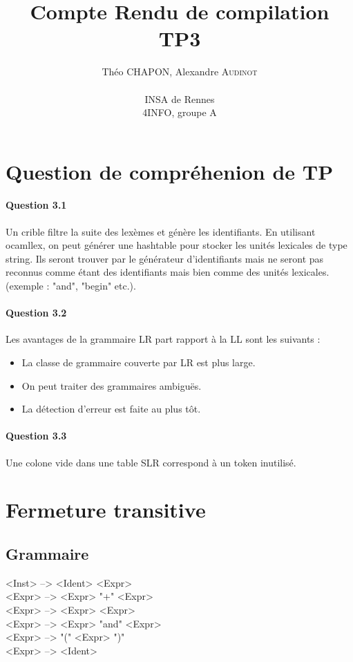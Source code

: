\documentclass[a4paper,12pt]{article}
\author{
  Théo \textsc{CHAPON}, Alexandre \textsc{Audinot} \\ \\
  INSA de Rennes \\
  4INFO, groupe A
}
\title{Compte Rendu de compilation TP3}
\begin{document}

\section{Question de compréhenion de TP}
\medskip

\paragraph{Question 3.1}
Un crible filtre la suite des lexèmes et génère les identifiants. En utilisant ocamllex, on peut générer une hashtable pour stocker les unités lexicales de type string. Ils seront trouver par le générateur d'identifiants mais ne seront pas reconnus comme étant des identifiants mais bien comme des unités lexicales. (exemple : "and", "begin" etc.). 
\medskip

\paragraph{Question 3.2}
Les avantages de la grammaire LR part rapport à la LL sont les suivants :
\begin{itemize}
\item La classe de grammaire couverte par LR est plus large.
\item On peut traiter des grammaires ambiguës.
\item La détection d'erreur est faite au plus tôt.
\end{itemize}
\medskip

\paragraph{Question 3.3}
Une colone vide dans une table SLR correspond à un token inutilisé.

\section{Fermeture transitive}
\subsection{Grammaire}
<Inst> --> <Ident> \text{<-} <Expr> \\
<Expr> --> <Expr> "+" <Expr> \\
<Expr> --> <Expr> \text{<} <Expr> \\
<Expr> --> <Expr> "and" <Expr> \\
<Expr> --> "(" <Expr> ")" \\
<Expr> --> <Ident> \\
\end{document}

